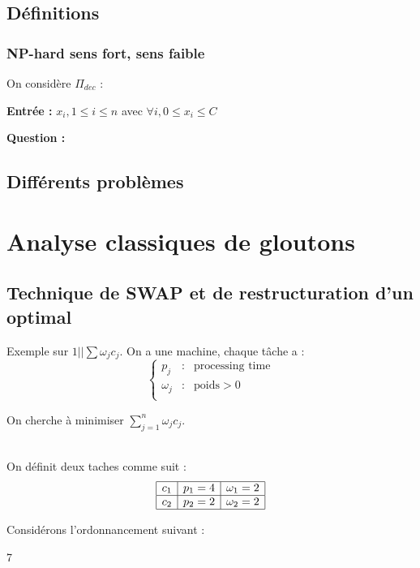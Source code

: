 \documentclass[a4paper, 11pt]{thesis}
\newcommand{\openord}[1]{\begin{center}\begin{ganttchart}[hgrid=true,vgrid={{dotted}},inline]{#1}
    \gantttitlelist{1,...,#1}{1}\\}
\newcommand{\closeord}{\end{ganttchart}\end{center}}
\begin{document}
\subsection{Définitions}

\subsubsection{NP-hard sens fort, sens faible}

On considère $\Pi_{dec}$ :

\textbf{Entrée :} $x_i, 1 \leq i \leq n$ avec $\forall i, 0 \leq x_i \leq C$

\textbf{Question :}


\subsection{Différents problèmes}

\section{Analyse classiques de gloutons}

\subsection{Technique de SWAP et de restructuration d'un optimal}

Exemple sur $1 | | \sum\omega_jc_j$. On a une machine, chaque tâche a : \begin{displaymath}
\left \lbrace \begin{array}{rcl}
    p_j & : & \mbox{processing time} \\
    \omega_j & : & \mbox{poids} > 0 \\
\end{array} \right .\end{displaymath}

On cherche à minimiser $\sum_{j =1}^n \omega_j c_j$.\\

\begin{ex}
    ~\\ On définit deux taches comme suit : 
    \begin{displaymath}
        \begin{array}{|c|c|c|}\hline
            c_1 & p_1 = 4 & \omega_1 = 2 \\ \hline
            c_2 & p_2 = 2 & \omega_2 = 2 \\ \hline
        \end{array}
    \end{displaymath}

    Considérons l'ordonnancement suivant : 

    \openord{7}
    \closeord
\end{ex}
\end{document}
